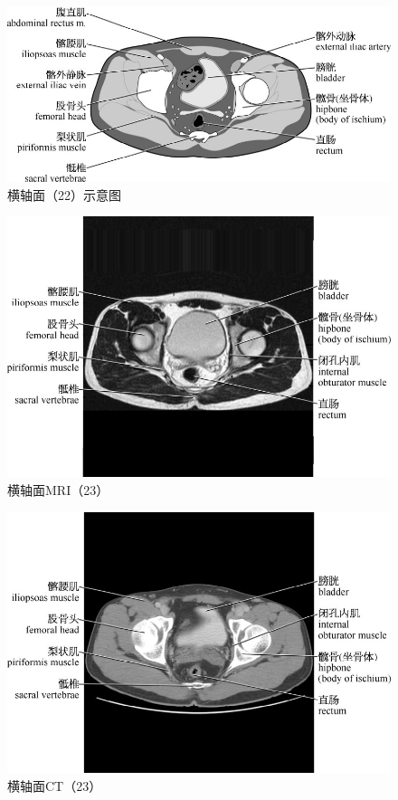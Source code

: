 \begin{figure}[!htbp]
 \centering
 \includegraphics{./images/Image00067.jpg}
 \captionsetup{justification=centering}
 \caption{横轴面（22）示意图}
  \end{figure} 
 \FloatBarrier

\begin{figure}[!htbp]
 \centering
 \includegraphics{./images/Image00068.jpg}
 \captionsetup{justification=centering}
 \caption{横轴面MRI（23）}
  \end{figure} 
 \FloatBarrier

\begin{figure}[!htbp]
 \centering
 \includegraphics{./images/Image00069.jpg}
 \captionsetup{justification=centering}
 \caption{横轴面CT（23）}
  \end{figure} 
 \FloatBarrier

